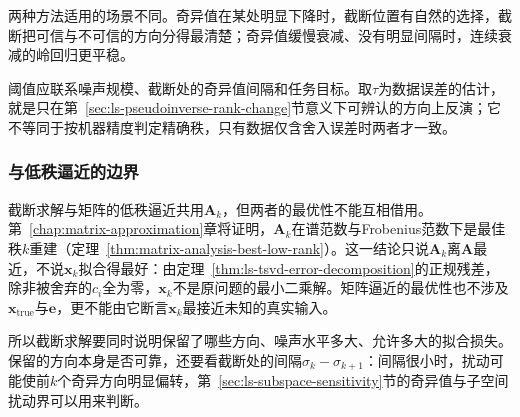 两种方法适用的场景不同。奇异值在某处明显下降时，截断位置有自然的选择，截断把可信与不可信的方向分得最清楚；奇异值缓慢衰减、没有明显间隔时，连续衰减的岭回归更平稳。

阈值应联系噪声规模、截断处的奇异值间隔和任务目标。取$\tau$为数据误差的估计，就是只在第~\ref{sec:ls-pseudoinverse-rank-change}节意义下可辨认的方向上反演；它不等同于按机器精度判定精确秩，只有数据仅含舍入误差时两者才一致。

\subsubsection{与低秩逼近的边界}
截断求解与矩阵的低秩逼近共用$\bm A_k$，但两者的最优性不能互相借用。第~\ref{chap:matrix-approximation}章将证明，$\bm A_k$在谱范数与Frobenius范数下是最佳秩$k$重建（定理~\ref{thm:matrix-analysis-best-low-rank}）。这一结论只说$\bm A_k$离$\bm A$最近，不说$\bm x_k$拟合得最好：由定理~\ref{thm:ls-tsvd-error-decomposition}的正规残差，除非被舍弃的$c_i$全为零，$\bm x_k$不是原问题的最小二乘解。矩阵逼近的最优性也不涉及$\bm x_{\mathrm{true}}$与$\bm e$，更不能由它断言$\bm x_k$最接近未知的真实输入。

所以截断求解要同时说明保留了哪些方向、噪声水平多大、允许多大的拟合损失。保留的方向本身是否可靠，还要看截断处的间隔$\sigma_k-\sigma_{k+1}$：间隔很小时，扰动可能使前$k$个奇异方向明显偏转，第~\ref{sec:ls-subspace-sensitivity}节的奇异值与子空间扰动界可以用来判断。
